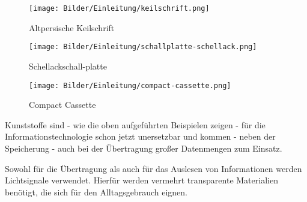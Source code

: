 \begin{figure}[h]
    \begin{center}
        \begin{minipage}[t]{0.3\textwidth}
            \begin{center}
                \texttt{[image: Bilder/Einleitung/keilschrift.png]}
                \caption[Altpersische Keilschrift \newline \url{http://www.faz.net/aktuell/feuilleton/geisteswissenschaften/keilschriften-zehntausend-freunde-mesopotamiens-1657070.html}]{Altpersische Keilschrift}
                \label{fig:keilschrift}
            \end{center}
        \end{minipage}
        \hspace{0.025\textwidth}
        \begin{minipage}[t]{0.3\textwidth}
            \begin{center}
                \texttt{[image: Bilder/Einleitung/schallplatte-schellack.png]}
                \caption[Schellackschallplatte \newline \url{https://de.wikipedia.org/wiki/Datei:Schallplatte_Deutsche_Grammophon_Stimme_seines_Herrn.jpg}]{Schellackschall-platte}
                \label{fig:schallplatte-schellack}
            \end{center}
        \end{minipage}
        \hspace{0.025\textwidth}
        \begin{minipage}[t]{0.3\textwidth}
            \begin{center}
                \texttt{[image: Bilder/Einleitung/compact-cassette.png]}
                \caption[Compact Cassette \newline \url{https://de.wikipedia.org/wiki/Datei:Compactcassette.jpg}]{Compact Cassette}
                \label{fig:compact-cassette}
            \end{center}
        \end{minipage}
    \end{center}
\end{figure}

Kunststoffe sind - wie die oben aufgeführten Beispielen zeigen - für die
Informationstechnologie schon jetzt unersetzbar und kommen - neben der
Speicherung - auch bei der Übertragung großer Datenmengen zum Einsatz.

Sowohl für die Übertragung als auch für das Auslesen von Informationen werden
Lichtsignale verwendet. Hierfür werden vermehrt transparente Materialien
benötigt, die sich für den Alltagsgebrauch eignen.

